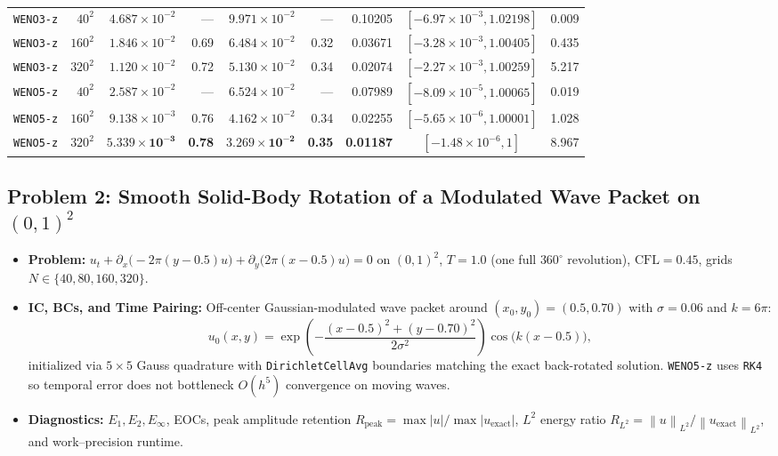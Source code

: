 \documentclass[11pt,a4paper]{article}
\theoremstyle{definition}
\newcommand{\norm}[1]{\left\lVert #1 \right\rVert}
\newcommand{\code}[1]{\texttt{#1}}
\begin{document}
\begin{table}[h]
\begin{tabular}{@{}lrrrrrrcr@{}}
\midrule
\code{WENO3-z}   & $40^2$  & $4.687\times 10^{-2}$ & ---  & $9.971\times 10^{-2}$ & ---  & 0.10205 & $[-6.97\times 10^{-3}, 1.02198]$ & 0.009 \\
\code{WENO3-z}   & $160^2$ & $1.846\times 10^{-2}$ & 0.69 & $6.484\times 10^{-2}$ & 0.32 & 0.03671 & $[-3.28\times 10^{-3}, 1.00405]$ & 0.435 \\
\code{WENO3-z}   & $320^2$ & $1.120\times 10^{-2}$ & 0.72 & $5.130\times 10^{-2}$ & 0.34 & 0.02074 & $[-2.27\times 10^{-3}, 1.00259]$ & 5.217 \\
\midrule
\code{WENO5-z}   & $40^2$  & $2.587\times 10^{-2}$ & ---  & $6.524\times 10^{-2}$ & ---  & 0.07989 & $[-8.09\times 10^{-5}, 1.00065]$ & 0.019 \\
\code{WENO5-z}   & $160^2$ & $9.138\times 10^{-3}$ & 0.76 & $4.162\times 10^{-2}$ & 0.34 & 0.02255 & $[-5.65\times 10^{-6}, 1.00001]$ & 1.028 \\
\code{WENO5-z}   & $320^2$ & $\mathbf{5.339\times 10^{-3}}$ & \textbf{0.78} & $\mathbf{3.269\times 10^{-2}}$ & \textbf{0.35} & \textbf{0.01187} & $[-1.48\times 10^{-6}, 1]$ & 8.967 \\
\bottomrule
\end{tabular}
\end{table}

\subsection{Problem 2: Smooth Solid-Body Rotation of a Modulated Wave Packet on $(0,1)^2$}

\begin{itemize}
\item \textbf{Problem:} $u_t + \partial_x\bigl(-2\pi(y - 0.5)u\bigr) + \partial_y\bigl(2\pi(x - 0.5)u\bigr) = 0$ on $(0,1)^2$, $T = 1.0$ (one full $360^\circ$ revolution), $\mathrm{CFL} = 0.45$, grids $N\in\{40,80,160,320\}$.
\item \textbf{IC, BCs, and Time Pairing:} Off-center Gaussian-modulated wave packet around $(x_0, y_0) = (0.5, 0.70)$ with $\sigma = 0.06$ and $k = 6\pi$:
\[
u_0(x,y) = \exp\!\left(-\frac{(x - 0.5)^2 + (y - 0.70)^2}{2\sigma^2}\right)\cos\!\bigl(k(x - 0.5)\bigr),
\]
initialized via $5\times 5$ Gauss quadrature with \code{DirichletCellAvg} boundaries matching the exact back-rotated solution. \code{WENO5-z} uses \code{RK4} so temporal error does not bottleneck $O(h^5)$ convergence on moving waves.
\item \textbf{Diagnostics:} $E_1, E_2, E_\infty$, EOCs, peak amplitude retention $R_{\text{peak}} = \max|u|/\max|u_{\text{exact}}|$, $L^2$ energy ratio $R_{L^2} = \norm{u}_{L^2}/\norm{u_{\text{exact}}}_{L^2}$, and work--precision runtime.
\end{itemize}
\end{document}
